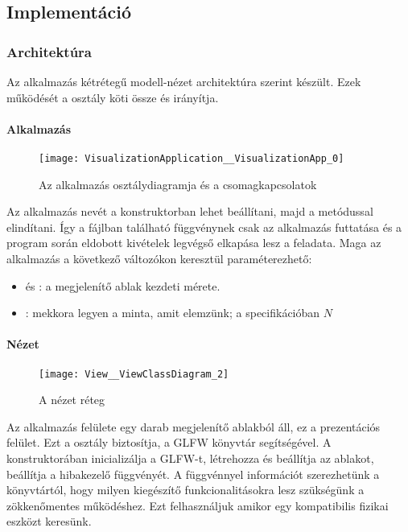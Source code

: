 
\subsection{Implement\'aci\'o}

\subsubsection{Architekt\'ura}
Az alkalmaz\'as k\'etr\'eteg\H u modell-n\'ezet architekt\'ura szerint k\'esz\"ult.
Ezek m\H uk\"od\'es\'et a  oszt\'aly k\"oti \"ossze \'es ir\'any\'itja.

\paragraph{Alkalmaz\'as}
\begin{figure}[h]
	\texttt{[image: VisualizationApplication\_\_VisualizationApp\_0]}
	\centering
	\caption{Az alkalmaz\'as oszt\'alydiagramja \'es a csomagkapcsolatok}
\end{figure}

Az alkalmaz\'as nev\'et a konstruktorban lehet be\'all\'itani, majd a  met\'odussal elind\'itani. \'Igy a  f\'ajlban tal\'alhat\'o  f\"uggv\'enynek csak az alkalmaz\'as futtat\'asa \'es a program sor\'an eldobott kiv\'etelek legv\'egs\H o elkap\'asa lesz a feladata.
Maga az alkalmaz\'as a k\"ovetkez\H o v\'altoz\'okon kereszt\"ul param\'eterezhet\H o:
\begin{itemize}
	\item {} \'es : a megjelen\'it\H o ablak kezdeti m\'erete.
	\item {}: mekkora legyen a minta, amit elemz\"unk; a specifik\'aci\'oban $N$
\end{itemize}

\paragraph{N\'ezet}
\begin{figure}[h]
	\texttt{[image: View\_\_ViewClassDiagram\_2]}
	\centering
	\caption{A n\'ezet r\'eteg}
\end{figure}
Az alkalmaz\'as fel\"ulete egy darab megjelen\'it\H o ablakb\'ol \'all, ez a prezent\'aci\'os fel\"ulet.
Ezt a  oszt\'aly biztos\'itja, a GLFW k\"onyvt\'ar seg\'its\'eg\'evel. \newline
A konstruktor\'aban inicializ\'alja a GLFW-t, l\'etrehozza \'es be\'all\'itja az ablakot, be\'all\'itja a hibakezel\H o f\"uggv\'eny\'et. \newline
A  f\"uggv\'ennyel inform\'aci\'ot szerezhet\"unk a k\"onyvt\'art\'ol, hogy milyen kieg\'esz\'it\H o funkcionalit\'asokra lesz sz\"uks\'eg\"unk a z\"okken\H omentes m\H uk\"od\'eshez. Ezt felhaszn\'aljuk amikor egy kompatibilis fizikai eszk\"ozt keres\"unk.

